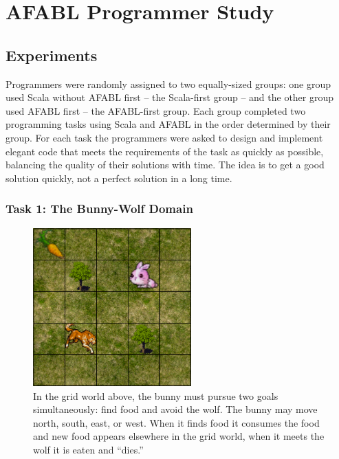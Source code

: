 \chapter{AFABL Programmer Study}\label{ch:programmer-study}

\section{Experiments}

Programmers were randomly assigned to two equally-sized groups: one group used Scala without AFABL first -- the Scala-first group -- and the other group used AFABL first -- the AFABL-first group.  Each group completed two programming tasks using Scala and AFABL in the order determined by their group.  For each task the programmers were asked to design and implement elegant code that meets the requirements of the task as quickly as possible, balancing the quality of their solutions with time.  The idea is to get a good solution quickly, not a perfect solution in a long time.

\subsection{Task 1: The Bunny-Wolf Domain}\label{sec:task1}

\begin{figure}[h]

\begin{center}
\includegraphics[height=2.4in]{bunny.png}
\end{center}


\caption{In the grid world above, the bunny must pursue two goals
  simultaneously: find food and avoid the wolf.  The bunny may move
  north, south, east, or west.  When it finds food it consumes the
  food and new food appears elsewhere in the grid world, when it meets
  the wolf it is eaten and ``dies.''}
\label{fig:bunny-picture}
\end{figure}

